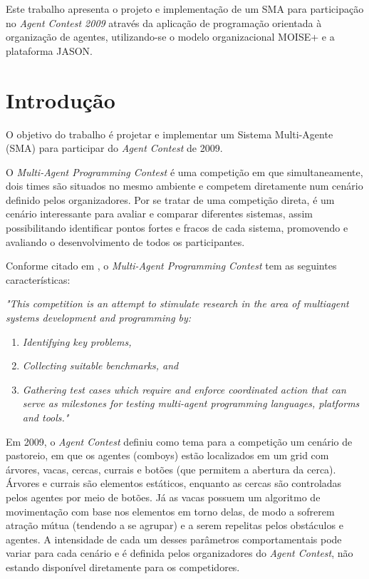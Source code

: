 \documentclass{llncs}
\renewenvironment{quote}{%
  \list{}{%
    \leftmargin3.0cm   %
    \rightmargin\leftmargin
  }
  \item\relax
}
{\endlist}
\begin{document}
\begin{abstract}
Este trabalho apresenta o projeto e implementação de um SMA para participação no \textit{Agent Contest 2009} através da aplicação de programação orientada à organização de agentes, utilizando-se o modelo organizacional MOISE+ e a plataforma JASON.
\end{abstract}

\section{Introdução}


O objetivo do trabalho é projetar e implementar um Sistema Multi-Agente (SMA) para participar do \textit{Agent Contest} de 2009.

O \textit{Multi-Agent Programming Contest} é uma competição em que simultaneamente, dois times são situados no mesmo ambiente e competem diretamente num cenário definido pelos organizadores. Por se tratar de uma competição direta, é um cenário interessante para avaliar e comparar diferentes sistemas, assim possibilitando identificar pontos fortes e fracos de cada sistema, promovendo e avaliando o desenvolvimento de todos os participantes.

Conforme citado em \cite{AC}, o \textit{Multi-Agent Programming Contest} tem as seguintes características:

\begin{quote}
\textit{"This competition is an attempt to stimulate research in the area of multiagent systems development and programming by:}
\begin{enumerate}
\item \textit{Identifying key problems,}
\item \textit{Collecting suitable benchmarks, and}
\item \textit{Gathering test cases which require and enforce coordinated action that can serve as milestones for testing multi-agent programming languages, platforms and tools."}
\end{enumerate}
\end{quote}

Em 2009, o \textit{Agent Contest} definiu como tema para a competição um cenário de pastoreio, em que os agentes (comboys) estão localizados em um grid com árvores, vacas, cercas, currais e botões (que permitem a abertura da cerca). Árvores e currais são elementos estáticos, enquanto as cercas são controladas pelos agentes por meio de botões. Já as vacas possuem um algoritmo de movimentação com base nos elementos em torno delas, de modo a sofrerem atração mútua (tendendo a se agrupar) e a serem repelitas pelos obstáculos e agentes. A intensidade de cada um desses parâmetros comportamentais pode variar para cada cenário e é definida pelos organizadores do \textit{Agent Contest}, não estando disponível diretamente para os competidores.
\end{document}
